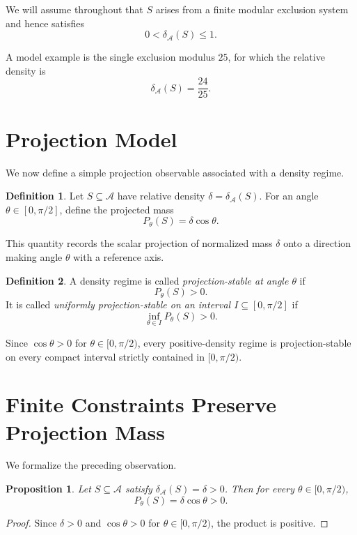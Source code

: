 \documentclass[11pt]{article}
\theoremstyle{plain}
\newtheorem{proposition}{Proposition}
\theoremstyle{definition}
\newtheorem{definition}{Definition}
\begin{document}
We will assume throughout that $S$ arises from a finite modular exclusion system and hence satisfies
\[
0 < \delta_{\mathcal{A}}(S) \le 1.
\]

A model example is the single exclusion modulus $25$, for which the relative density is
\[
\delta_{\mathcal{A}}(S)=\frac{24}{25}.
\]

\section{Projection Model}

We now define a simple projection observable associated with a density regime.

\begin{definition}
Let $S \subseteq \mathcal{A}$ have relative density $\delta = \delta_{\mathcal{A}}(S)$. For an angle $\theta \in [0,\pi/2]$, define the projected mass
\[
P_\theta(S) = \delta \cos \theta.
\]
\end{definition}

This quantity records the scalar projection of normalized mass $\delta$ onto a direction making angle $\theta$ with a reference axis.

\begin{definition}
A density regime is called \emph{projection-stable at angle $\theta$} if
\[
P_\theta(S) > 0.
\]
It is called \emph{uniformly projection-stable on an interval $I \subseteq [0,\pi/2]$} if
\[
\inf_{\theta \in I} P_\theta(S) > 0.
\]
\end{definition}

Since $\cos \theta > 0$ for $\theta \in [0,\pi/2)$, every positive-density regime is projection-stable on every compact interval strictly contained in $[0,\pi/2)$.

\section{Finite Constraints Preserve Projection Mass}

We formalize the preceding observation.

\begin{proposition}
Let $S \subseteq \mathcal{A}$ satisfy $\delta_{\mathcal{A}}(S)=\delta>0$. Then for every $\theta \in [0,\pi/2)$,
\[
P_\theta(S)=\delta\cos\theta > 0.
\]
\end{proposition}

\begin{proof}
Since $\delta>0$ and $\cos\theta>0$ for $\theta \in [0,\pi/2)$, the product is positive.
\end{proof}
\end{document}
